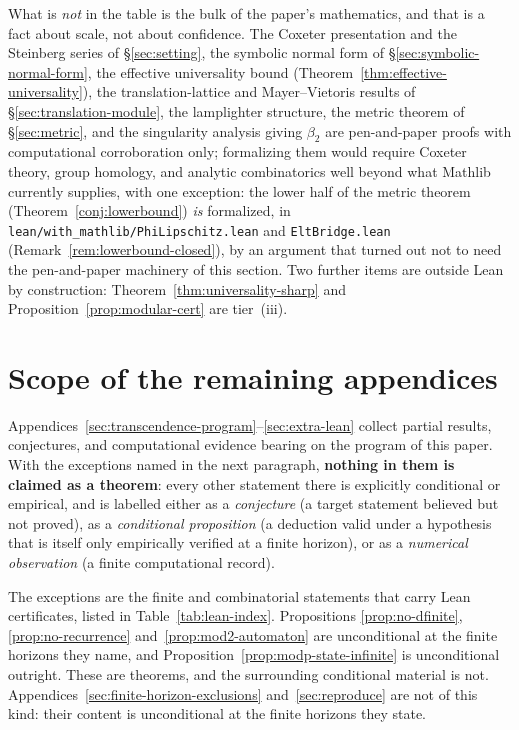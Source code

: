 \documentclass[11pt]{article}
\theoremstyle{plain}
\theoremstyle{definition}
\theoremstyle{remark}
\begin{document}
What is \emph{not} in the table is the bulk of the paper's mathematics, and
that is a fact about scale, not about confidence. The Coxeter presentation
and the Steinberg series of \S\ref{sec:setting}, the symbolic normal form of
\S\ref{sec:symbolic-normal-form}, the effective universality bound
(Theorem~\ref{thm:effective-universality}), the translation-lattice and
Mayer--Vietoris results of \S\ref{sec:translation-module}, the lamplighter structure, the
metric theorem of \S\ref{sec:metric}, and the singularity analysis giving
$\beta_2$ are pen-and-paper proofs with computational corroboration only;
formalizing them would require Coxeter theory, group homology, and analytic
combinatorics well beyond what Mathlib currently supplies, with one exception:
the lower half of the metric theorem (Theorem~\ref{conj:lowerbound}) \emph{is}
formalized, in \texttt{lean/with\_mathlib/PhiLipschitz.lean} and
\texttt{EltBridge.lean} (Remark~\ref{rem:lowerbound-closed}), by an argument
that turned out not to need the pen-and-paper machinery of this section. Two
further items are outside Lean by construction: Theorem~\ref{thm:universality-sharp} and
Proposition~\ref{prop:modular-cert} are tier~(iii).

\section{Scope of the remaining appendices}
\label{sec:extra-scope}

Appendices~\ref{sec:transcendence-program}--\ref{sec:extra-lean} collect
partial results, conjectures, and computational evidence bearing on the
program of this paper. With the exceptions named in the next paragraph,
\textbf{nothing in them is claimed as a theorem}: every other statement there
is explicitly conditional or empirical, and is labelled either as a
\emph{conjecture} (a target statement believed but not proved), as
a \emph{conditional proposition} (a deduction valid under a hypothesis that is
itself only empirically verified at a finite horizon), or as a
\emph{numerical observation} (a finite computational record).

The exceptions are the finite and combinatorial statements that carry Lean
certificates, listed in Table~\ref{tab:lean-index}. Propositions
\ref{prop:no-dfinite}, \ref{prop:no-recurrence} and~\ref{prop:mod2-automaton}
are unconditional at the finite horizons they name, and
Proposition~\ref{prop:modp-state-infinite} is unconditional outright. These
are theorems, and the surrounding conditional material is not.
Appendices~\ref{sec:finite-horizon-exclusions} and~\ref{sec:reproduce} are not
of this kind: their content is unconditional at the finite horizons they
state.
\end{document}
